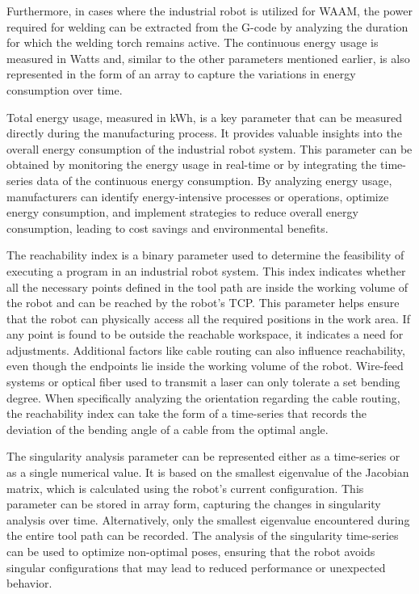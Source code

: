 Furthermore, in cases where the industrial robot is utilized for WAAM, the power required for welding can be extracted from the G-code by analyzing the duration for which the welding torch remains active. The continuous energy usage is measured in Watts and, similar to the other parameters mentioned earlier, is also represented in the form of an array to capture the variations in energy consumption over time.

Total energy usage, measured in kWh, is a key parameter that can be measured directly during the manufacturing process. It provides valuable insights into the overall energy consumption of the industrial robot system. This parameter can be obtained by monitoring the energy usage in real-time or by integrating the time-series data of the continuous energy consumption. By analyzing energy usage, manufacturers can identify energy-intensive processes or operations, optimize energy consumption, and implement strategies to reduce overall energy consumption, leading to cost savings and environmental benefits.



The reachability index is a binary parameter used to determine the feasibility of executing a program in an industrial robot system. This index indicates whether all the necessary points defined in the tool path are inside the working volume of the robot and can be reached by the robot's TCP. This parameter helps ensure that the robot can physically access all the required positions in the work area. If any point is found to be outside the reachable workspace, it indicates a need for adjustments. Additional factors like cable routing can also influence reachability, even though the endpoints lie inside the working volume of the robot. Wire-feed systems or optical fiber used to transmit a laser can only tolerate a set bending degree. When specifically analyzing the orientation regarding the cable routing, the reachability index can take the form of a time-series that records the deviation of the bending angle of a cable from the optimal angle.


The singularity analysis parameter can be represented either as a time-series or as a single numerical value. It is based on the smallest eigenvalue of the Jacobian matrix, which is calculated using the robot's current configuration. This parameter can be stored in array form, capturing the changes in singularity analysis over time. Alternatively, only the smallest eigenvalue encountered during the entire tool path can be recorded. The analysis of the singularity time-series can be used to optimize non-optimal poses, ensuring that the robot avoids singular configurations that may lead to reduced performance or unexpected behavior.

